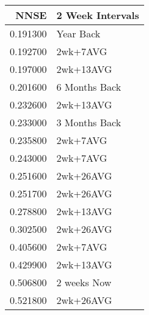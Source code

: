 \begin{tabular}{rl}
NNSE & 2 Week Intervals \\
\hline
0.191300 & Year Back \\
0.192700 & 2wk+7AVG \\
0.197000 & 2wk+13AVG \\
0.201600 & 6 Months Back \\
0.232600 & 2wk+13AVG \\
0.233000 & 3 Months Back \\
0.235800 & 2wk+7AVG \\
0.243000 & 2wk+7AVG \\
0.251600 & 2wk+26AVG \\
0.251700 & 2wk+26AVG \\
0.278800 & 2wk+13AVG \\
0.302500 & 2wk+26AVG \\
0.405600 & 2wk+7AVG \\
0.429900 & 2wk+13AVG \\
0.506800 & 2 weeks Now \\
0.521800 & 2wk+26AVG \\
\hline
\end{tabular}